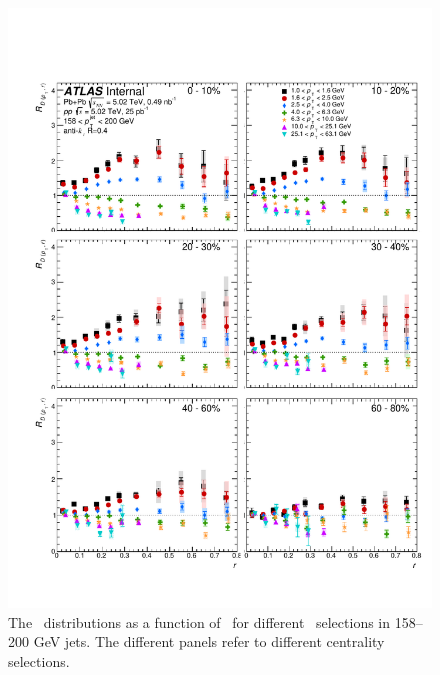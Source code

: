 \begin{figure}[h]
\includegraphics[width=1.0\textwidth]{figures/results/RDpT_dR_jet8.pdf}
\caption{The \RDptr\ distributions as a function of \rvar\ for different \pt\ selections in 158--200 GeV jets. The different panels refer to different centrality selections.}
\label{fig:fullset_rptr_j8}
\end{figure}

